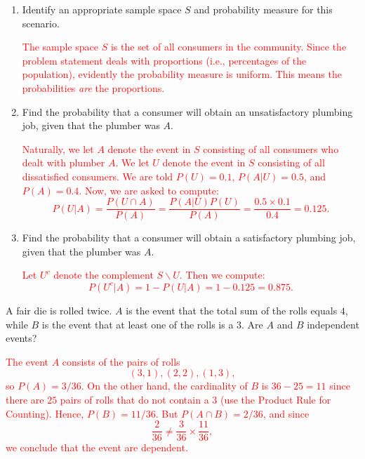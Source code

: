 \documentclass[12pt,reqno]{amsart}
\begin{document}
\medskip
\begin{enumerate}
\item Identify an appropriate sample space $S$ and probability measure for this scenario.
    
\bigskip
\textcolor{red}{The sample space $S$ is the set of all consumers in the community. Since the problem statement deals with proportions (i.e., percentages of the population), evidently the probability measure is uniform. This means the probabilities \textit{are} the proportions.}
\bigskip

\item Find the probability that a consumer will obtain an unsatisfactory plumbing job, given that the plumber was $A$.
    
\bigskip
\textcolor{red}{Naturally, we let $A$ denote the event in $S$ consisting of all consumers who dealt with plumber $A$. We let $U$ denote the event in $S$ consisting of all dissatisfied consumers. We are told $P(U)=0.1$, $P(A| U) = 0.5$, and $P(A)=0.4$. Now, we are asked to compute:
	\[
	P(U|A) = \frac{P(U\cap A)}{P(A)} = \frac{P(A|U)P(U)}{P(A)} = \frac{0.5 \times 0.1}{0.4} = 0.125.
	\]}
\bigskip

\item Find the probability that a consumer will obtain a satisfactory plumbing job, given that the plumber was $A$.
    
\bigskip
\textcolor{red}{Let $U^c$ denote the complement $S\smallsetminus U$. Then we compute:
	\[
	P(U^c | A) = 1 - P(U|A) = 1 - 0.125 = 0.875.
	\]}
\end{enumerate}














\bigskip
\prob A fair die is rolled twice. $A$ is the event that the total sum of the rolls equals $4$, while $B$ is the event that at least one of the rolls is a 3. Are $A$ and $B$ independent events?

\bigskip
\textcolor{red}{The event $A$ consists of the pairs of rolls
	\[
	(3,1),(2,2),(1,3),
	\]
so $P(A) = 3/36$. On the other hand, the cardinality of $B$ is $36-25 = 11$ since there are $25$ pairs of rolls that do not contain a $3$ (use the Product Rule for Counting). Hence, $P(B) = 11/36$. But $P(A\cap B) = 2/36$, and since
	\[
	\frac{2}{36} \neq \frac{3}{36} \times \frac{11}{36},
	\]
we conclude that the event are dependent.}
\bigskip
\end{document}
